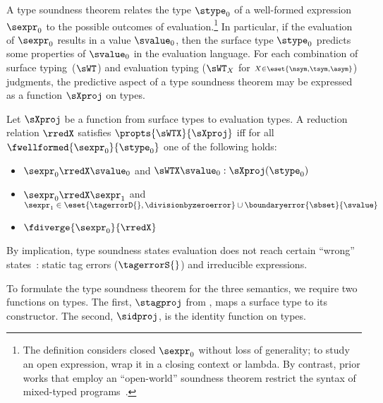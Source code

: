 
A type soundness theorem relates the type $\stype_0$ of a well-formed
 expression $\sexpr_0$ to the possible outcomes of evaluation.\footnote{The
  definition considers closed $\sexpr_0$ without loss of generality;
  to study an open expression, wrap it in a closing context or lambda.
  By contrast, prior works that employ an ``open-world'' soundness theorem
  restrict the syntax of mixed-typed programs~\cite{tf-dls-2006, vss-popl-2017}.}
In particular, if the evaluation of $\sexpr_0$ results in
 a value $\svalue_0$, then the surface type $\stype_0$ predicts some properties
 of $\svalue_0$ in the evaluation language.
For each combination of surface typing~($\sWT$) and evaluation typing
  ($\sWT_X$ for $\scriptstyle X \in \eset{\nsym, \tsym, \asym}$) judgments,
  the predictive aspect of a type soundness theorem may be expressed as a
  function $\sXproj$ on types.

\begin{definition}
  Let $\sXproj$ be a function from surface types to evaluation types.
  A reduction relation $\rredX$ satisfies $\propts{\sWTX}{\sXproj}$ iff for all
  $\fwellformed{\sexpr_0}{\stype_0}$ one of the following holds:
  \begin{itemize}
    \itemsep0.5ex
    \item \label{clause:F}
      $\sexpr_0 \rredX \svalue_0$
      and $\sWTX \svalue_0 : \sXproj(\stype_0)$
    \item
      $\sexpr_0 \rredX \sexpr_1$
      and $\sexpr_1 \in \eset{\tagerrorD{}, \divisionbyzeroerror} \cup \boundaryerror{\sbset}{\svalue}$
    \item
      $\fdiverge{\sexpr_0}{\rredX}$
  \end{itemize}
\end{definition}

By implication, type soundness states evaluation does not reach certain
 ``wrong'' states~\cite{m-jcss-1978}: static tag errors ($\tagerrorS{}$)
 and irreducible expressions.

To formulate the type soundness theorem for the three semantics, we
require two functions on types.
The first, $\stagproj$ from , maps a surface type
to its constructor.
The second, $\sidproj$, is the identity function on types.

